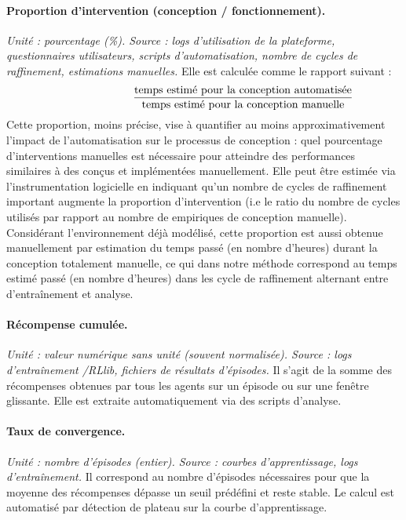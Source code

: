 \paragraph{Proportion d'intervention (conception / fonctionnement).}
\textit{Unité : pourcentage (\%). Source : logs d'utilisation de la plateforme, questionnaires utilisateurs, scripts d'automatisation, nombre de cycles de raffinement, estimations manuelles.}
Elle est calculée comme le rapport suivant :
\[
  \hspace{2.5cm}\frac{\text{temps estimé pour la conception automatisée}}{\text{temps estimé pour la conception manuelle}}
\]
Cette proportion, moins précise, vise à quantifier au moins approximativement l'impact de l'automatisation sur le processus de conception : quel pourcentage d'interventions manuelles est nécessaire pour atteindre des performances similaires à des  conçus et implémentées manuellement. Elle peut être estimée via l'instrumentation logicielle en indiquant qu'un nombre de cycles de raffinement important augmente la proportion d'intervention (i.e le ratio du nombre de cycles utilisés par rapport au nombre de  empiriques de conception manuelle). Considérant l'environnement déjà modélisé, cette proportion est aussi obtenue manuellement par estimation du temps passé (en nombre d'heures) durant la conception totalement manuelle, ce qui dans notre méthode correspond au temps estimé passé (en nombre d'heures) dans les cycle de raffinement alternant entre d'entraînement et analyse.

\paragraph{Récompense cumulée.}
\textit{Unité : valeur numérique sans unité (souvent normalisée). Source : logs d'entraînement /RLlib, fichiers de résultats d'épisodes.}
Il s'agit de la somme des récompenses obtenues par tous les agents sur un épisode ou sur une fenêtre glissante.
Elle est extraite automatiquement via des scripts d'analyse.

\paragraph{Taux de convergence.}
\textit{Unité : nombre d'épisodes (entier). Source : courbes d'apprentissage, logs d'entraînement.}
Il correspond au nombre d'épisodes nécessaires pour que la moyenne des récompenses dépasse un seuil prédéfini et reste stable.
Le calcul est automatisé par détection de plateau sur la courbe d'apprentissage.


